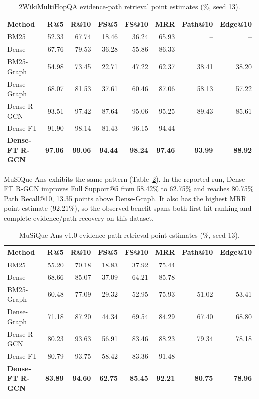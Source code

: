 \begin{table}[t]
\centering
\small
\setlength{\tabcolsep}{4pt}
\caption{2WikiMultiHopQA evidence-path retrieval point estimates (\%, seed 13).}
\label{tab:2wiki}
\begin{tabular}{lrrrrrrr}
\hline
Method & R@5 & R@10 & FS@5 & FS@10 & MRR & Path@10 & Edge@10 \\
\hline
BM25 & 52.33 & 67.74 & 18.46 & 36.24 & 65.93 & -- & -- \\
Dense & 67.76 & 79.53 & 36.28 & 55.86 & 86.33 & -- & -- \\
BM25-Graph & 54.98 & 73.45 & 22.71 & 47.22 & 62.37 & 38.41 & 38.20 \\
Dense-Graph & 68.07 & 81.53 & 37.61 & 60.46 & 87.06 & 58.13 & 57.22 \\
Dense R-GCN & 93.51 & 97.42 & 87.64 & 95.06 & 95.25 & 89.43 & 85.61 \\
Dense-FT & 91.90 & 98.14 & 81.43 & 96.15 & 94.44 & -- & -- \\
\textbf{Dense-FT R-GCN} & \textbf{97.06} & \textbf{99.06} &
\textbf{94.44} & \textbf{98.24} & \textbf{97.46} &
\textbf{93.99} & \textbf{88.92} \\
\hline
\end{tabular}
\end{table}

MuSiQue-Ans exhibits the same pattern (Table~\ref{tab:musique}). In the
reported run, Dense-FT R-GCN improves Full Support@5 from 58.42\% to
62.75\% and reaches 80.75\% Path Recall@10, 13.35 points above
Dense-Graph. It also has the highest MRR point estimate (92.21\%), so the
observed benefit spans both first-hit ranking and complete evidence/path
recovery on this dataset.

\begin{table}[t]
\centering
\small
\setlength{\tabcolsep}{4pt}
\caption{MuSiQue-Ans v1.0 evidence-path retrieval point estimates (\%, seed 13).}
\label{tab:musique}
\begin{tabular}{lrrrrrrr}
\hline
Method & R@5 & R@10 & FS@5 & FS@10 & MRR & Path@10 & Edge@10 \\
\hline
BM25 & 55.20 & 70.18 & 18.83 & 37.92 & 75.44 & -- & -- \\
Dense & 68.66 & 85.07 & 37.09 & 64.21 & 85.78 & -- & -- \\
BM25-Graph & 60.48 & 77.09 & 29.32 & 52.95 & 75.93 & 51.02 & 53.41 \\
Dense-Graph & 71.18 & 87.20 & 44.34 & 69.54 & 84.29 & 67.40 & 68.80 \\
Dense R-GCN & 80.23 & 93.63 & 56.91 & 83.46 & 88.23 & 79.34 & 78.18 \\
Dense-FT & 80.79 & 93.75 & 58.42 & 83.36 & 91.48 & -- & -- \\
\textbf{Dense-FT R-GCN} & \textbf{83.89} & \textbf{94.60} &
\textbf{62.75} & \textbf{85.45} & \textbf{92.21} &
\textbf{80.75} & \textbf{78.96} \\
\hline
\end{tabular}
\end{table}


